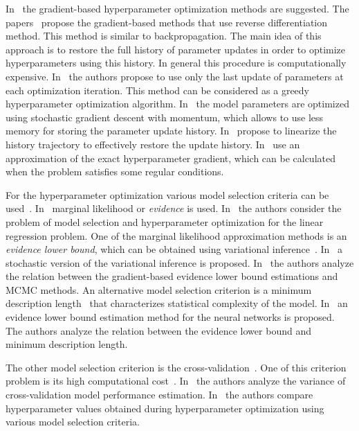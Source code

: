 \documentclass[smallcondensed]{svjour3}
\begin{document}
In~\cite{hyper,hyper2,hyper_mad,hyper_hoag,hyper_greed} the gradient-based hyperparameter optimization methods are suggested. The papers~\cite{hyper_mad,hyper} propose the gradient-based methods that use reverse differentiation method. This method is similar to backpropagation. The main idea of this approach is to restore the full history of parameter updates in order to optimize hyperparameters using this history. In general this procedure is computationally expensive. In~\cite{hyper_greed} the authors propose to use only the last update of parameters at each optimization iteration. This method can be considered as a greedy hyperparameter optimization algorithm. In~\cite{hyper}  the model parameters are optimized using stochastic gradient descent with momentum, which allows to use less memory for storing the parameter update history. In~\cite{hyper_mad} propose to linearize the history trajectory to effectively restore the update history. In~\cite{hyper_hoag} use an approximation of the exact hyperparameter gradient, which can be calculated when the problem satisfies some regular conditions.

For the hyperparameter optimization various model selection criteria can be used~\cite{MacKay,Bishop}. 
In~\cite{MacKay,Bishop,tokmakova,strijov_dsc}  marginal likelihood or \textit{evidence} is used. In~\cite{tokmakova,strijov_dsc} the authors consider the problem of model selection and hyperparameter optimization for the linear regression problem. One of  the marginal likelihood approximation methods is an \textit{evidence lower bound}, which can be obtained using variational inference~\cite{Bishop}. In~\cite{hoffman} a stochastic version of the variational inference is proposed. In~\cite{varmc} the authors analyze the relation between the gradient-based evidence lower bound estimations and MCMC methods. An alternative model selection criterion is a minimum description length~\cite{mdl} that characterizes statistical complexity of the model. In~\cite{nips} an evidence lower bound estimation method for the neural networks is proposed. The authors analyze the relation between the evidence lower bound and minimum description length. 

The other model selection criterion is the cross-validation~\cite{cv_ms,tokmakova}. One of this criterion problem  is its high computational cost~\cite{expensive,expensive2}. In~\cite{bias,bias2} the authors analyze the variance of cross-validation model performance estimation. In~\cite{tokmakova} the authors compare hyperparameter values obtained during hyperparameter optimization using various model selection criteria.
\end{document}
